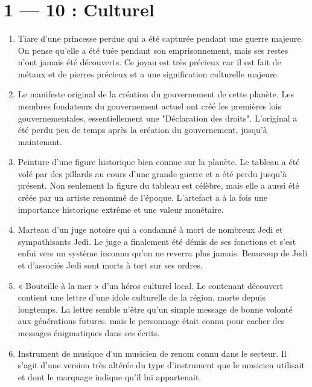 \documentclass{article}
\begin{document}
\title{\vspace{-0.5cm}{\Huge Artefacts sssStar Wars} \vspace{-1cm}}

\date{}

\maketitle

\section*{1 --- 10 : Culturel}
\begin{enumerate}
	\item Tiare d'une princesse perdue qui a été capturée pendant une guerre majeure. On pense qu'elle a été tuée pendant son emprisonnement, mais ses restes n'ont jamais été découverts. Ce joyau est très précieux car il est fait de métaux et de pierres précieux et a une signification culturelle majeure.
	\item Le manifeste original de la création du gouvernement de cette planète. Les membres fondateurs du gouvernement actuel ont créé les premières lois gouvernementales, essentiellement une "Déclaration des droits". L'original a été perdu peu de temps après la création du gouvernement, jusqu'à maintenant.
	\item Peinture d'une figure historique bien connue sur la planète. Le tableau a été volé par des pillards au cours d'une grande guerre et a été perdu jusqu'à présent. Non seulement la figure du tableau est célèbre, mais elle a aussi été créée par un artiste renommé de l'époque. L'artefact a à la fois une importance historique extrême et une valeur monétaire.
	\item Marteau d'un juge notoire qui a condamné à mort de nombreux Jedi et sympathisants Jedi. Le juge a finalement été démis de ses fonctions et s'est enfui vers un système inconnu qu'on ne reverra plus jamais. Beaucoup de Jedi et d'associés Jedi sont morts à tort sur ses ordres.
	\item « Bouteille à la mer » d'un héros culturel local. Le contenant découvert contient une lettre d'une idole culturelle de la région, morte depuis longtemps. La lettre semble n'être qu'un simple message de bonne volonté aux générations futures, mais le personnage était connu pour cacher des messages énigmatiques dans ses écrits.
	\item Instrument de musique d'un musicien de renom connu dans le secteur. Il s'agit d'une version très altérée du type d'instrument que le musicien utilisait et dont le marquage indique qu'il lui appartenait.

\end{enumerate}
\end{document}
